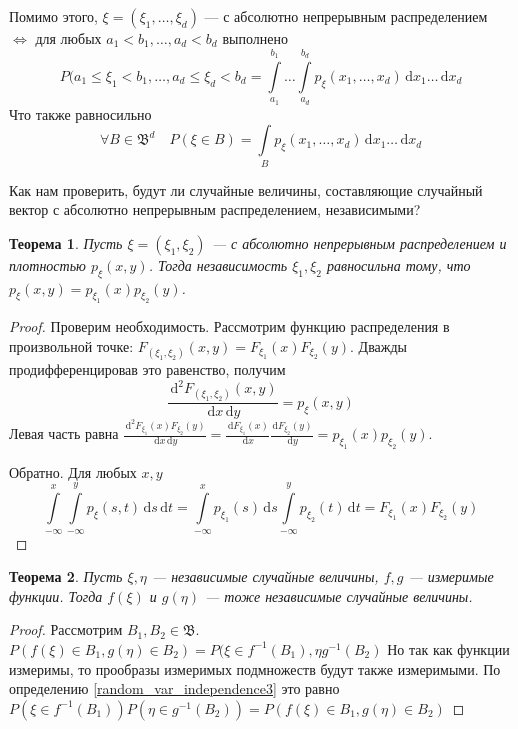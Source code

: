 \documentclass[11pt,openany,a4paper]{scrartcl}
\theoremstyle{plain}
\newtheorem{theorem}{Теорема}[subsection]
\theoremstyle{definition}
\newcommand{\dif}{\, \mathrm d}
\begin{document}
Помимо этого, $\xi = (\xi_1, \ldots, \xi_d)$ —
с абсолютно непрерывным распределением
$\iff$ для любых $a_1 < b_1, \ldots, a_d < b_d$ выполнено
$$
P(a_1 \leqslant \xi_1 < b_1, \ldots, a_d \leqslant \xi_d < b_d =
\int\limits_{a_1}^{b_1}\ldots\int\limits_{a_d}^{b_d} p_\xi(x_1, \ldots, x_d)
\dif x_1\ldots \dif x_d
$$
Что также равносильно
$$
\forall B \in \mathfrak B^d\quad P(\xi \in B) = \int\limits_B p_\xi(x_1, \ldots, x_d)
\dif x_1\ldots \dif x_d
$$

Как нам проверить, будут ли случайные величины, составляющие случайный вектор
с абсолютно непрерывным распределением, независимыми?

\begin{theorem}
    Пусть $\xi = (\xi_1, \xi_2)$ — с абсолютно непрерывным распределением и 
    плотностью $p_\xi(x, y)$. Тогда независимость $\xi_1, \xi_2$ равносильна
    тому, что $p_\xi(x, y) = p_{\xi_1}(x)p_{\xi_2}(y)$.
\end{theorem}
\begin{proof}
    Проверим необходимость. Рассмотрим функцию распределения в произвольной точке:
    $F_{(\xi_1, \xi_2)}(x, y) = F_{\xi_1}(x)F_{\xi_2}(y)$. Дважды 
    продифференцировав это равенство, получим
    $$
    \frac{\dif^2 F_{(\xi_1, \xi_2)}(x, y)}{\dif x \dif y} = p_\xi(x, y)
    $$
    Левая часть равна $\frac{\dif^2 F_{\xi_1}(x)F_{\xi_2}(y)}{\dif x \dif y} =
    \frac{\dif F_{\xi_1}(x)}{\dif x}\frac{\dif F_{\xi_2}(y)}{\dif y} =
    p_{\xi_1}(x)p_{\xi_2}(y)$.
    
    Обратно. Для любых $x, y$
    $$
    \int\limits_{-\infty}^x\int\limits_{-\infty}^y p_\xi(s, t) \dif s \dif t =
    \int\limits_{-\infty}^x p_{\xi_1}(s) \dif s
    \int\limits_{-\infty}^y p_{\xi_2}(t) \dif t =
    F_{\xi_1}(x)F_{\xi_2}(y)
    $$
\end{proof}

\begin{theorem}\label{functions_of_independent_variables}
    Пусть $\xi, \eta$ — независимые случайные величины, $f, g$ — измеримые 
    функции. Тогда $f(\xi)$ и $g(\eta)$ — тоже независимые случайные величины.
\end{theorem}
\begin{proof}
    Рассмотрим $B_1, B_2 \in \mathfrak B$.
    $P(f(\xi) \in B_1, g(\eta) \in B_2) = P(\xi \in f^{-1}(B_1), \eta g^{-1}(B_2)$
    Но так как функции измеримы, то прообразы измеримых подмножеств будут также 
    измеримыми. По определению \ref{random_var_independence3} это равно
    $P(\xi \in f^{-1}(B_1)) P(\eta \in g^{-1}(B_2)) = P(f(\xi) \in B_1,
    g(\eta) \in B_2)$
\end{proof}
\end{document}
